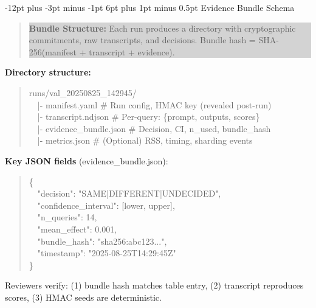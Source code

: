 \documentclass[11pt]{article}
\makeatletter
\renewcommand\subsection{\@startsection{subsection}{2}{\z@}%
  {-12pt plus -3pt minus -1pt}%
  {6pt plus 1pt minus 0.5pt}%
  {\normalfont\large\bfseries}}
\makeatother
\begin{document}
\subsection{Evidence Bundle Schema}

\begin{quote}
\colorbox{lightgray}{\parbox{0.95\textwidth}{
\textbf{Bundle Structure:} Each run produces a directory with cryptographic commitments, raw transcripts, and decisions. Bundle hash = SHA-256(manifest + transcript + evidence).
}}
\end{quote}

\noindent\textbf{Directory structure:}
\begin{quote}
\small
runs/val\_20250825\_142945/\\
~~|- manifest.yaml \hfill \# Run config, HMAC key (revealed post-run)\\
~~|- transcript.ndjson \hfill \# Per-query: \{prompt, outputs, scores\}\\
~~|- evidence\_bundle.json \hfill \# Decision, CI, n\_used, bundle\_hash\\
~~|- metrics.json \hfill \# (Optional) RSS, timing, sharding events
\end{quote}

\noindent\textbf{Key JSON fields} (evidence\_bundle.json):
\begin{quote}
\small
\{\\
~~"decision": "SAME|DIFFERENT|UNDECIDED",\\
~~"confidence\_interval": [lower, upper],\\
~~"n\_queries": 14,\\
~~"mean\_effect": 0.001,\\
~~"bundle\_hash": "sha256:abc123...",\\
~~"timestamp": "2025-08-25T14:29:45Z"\\
\}
\end{quote}

Reviewers verify: (1) bundle hash matches table entry, (2) transcript reproduces scores, (3) HMAC seeds are deterministic.
\end{document}
